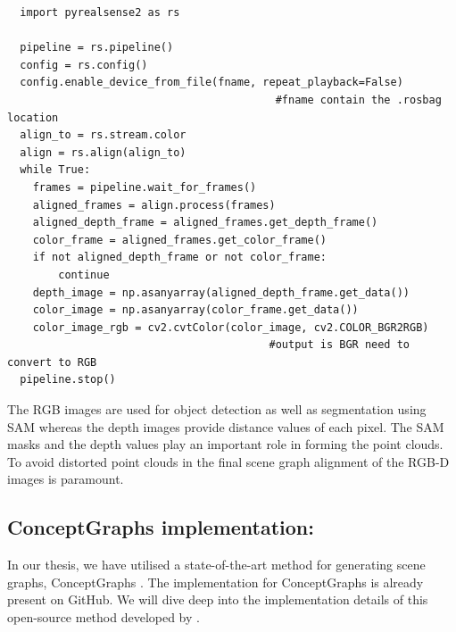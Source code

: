 \begin{lstlisting}
  import pyrealsense2 as rs

  pipeline = rs.pipeline()     
  config = rs.config()
  config.enable_device_from_file(fname, repeat_playback=False) 
                                          #fname contain the .rosbag location
  align_to = rs.stream.color
  align = rs.align(align_to)
  while True:
    frames = pipeline.wait_for_frames()
    aligned_frames = align.process(frames)
    aligned_depth_frame = aligned_frames.get_depth_frame()
    color_frame = aligned_frames.get_color_frame()
    if not aligned_depth_frame or not color_frame:
        continue
    depth_image = np.asanyarray(aligned_depth_frame.get_data())
    color_image = np.asanyarray(color_frame.get_data())
    color_image_rgb = cv2.cvtColor(color_image, cv2.COLOR_BGR2RGB) 
                                         #output is BGR need to convert to RGB
  pipeline.stop()
\end{lstlisting}
The RGB images are used for object detection as well as segmentation using SAM whereas the depth images provide distance values of each pixel.
The SAM masks and the depth values play an important role in forming the point clouds. To avoid distorted point clouds in the final scene graph 
alignment of the RGB-D images is paramount.

\subsection{ConceptGraphs implementation:}
In our thesis, we have utilised a state-of-the-art method for generating scene graphs, ConceptGraphs \cite{gu2023conceptgraphsopenvocabulary3dscene}.
 The implementation for ConceptGraphs is already present on GitHub. We will dive deep into the implementation details of this open-source method developed by \citet{gu2023conceptgraphsopenvocabulary3dscene}.


